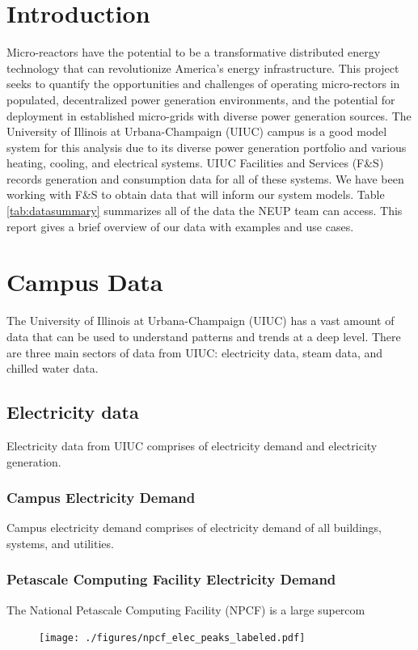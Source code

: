 \section*{Introduction}
	Micro-reactors have the potential to be a transformative distributed energy technology that can revolutionize America's energy infrastructure.
	This project seeks to quantify the opportunities and challenges of operating micro-rectors in populated, decentralized power generation environments, and the potential for deployment in established micro-grids with diverse power generation sources.
	The University of Illinois at Urbana-Champaign (UIUC) campus is a good model system for this analysis due to its diverse power generation portfolio and various heating, cooling, and electrical systems.
	UIUC Facilities and Services (F\&S) records generation and consumption data for all of these systems. We have been working with F\&S to obtain data that will inform our system models. Table \ref{tab:datasummary} summarizes all of the data the NEUP team can access. This report gives a brief overview of our data with examples and use cases.


\section{Campus Data}
	The University of Illinois at Urbana-Champaign (UIUC) has a vast amount of
data that can be used to understand patterns and trends at a deep level. There are three main sectors of data from UIUC: electricity data, steam data, and chilled water data.  

	\subsection{Electricity data}
		Electricity data from UIUC comprises of electricity demand and electricity generation. 
		\subsubsection{Campus Electricity Demand}
			Campus electricity demand comprises of electricity demand of all buildings, systems, and utilities.

			
		\subsubsection{Petascale Computing Facility Electricity Demand}
		The National Petascale Computing Facility (NPCF) is a large supercom
			\begin{figure}[H]
			  \centering
			  \texttt{[image: ./figures/npcf\_elec\_peaks\_labeled.pdf]}
			  \label{fig:typstm}
			\end{figure}

